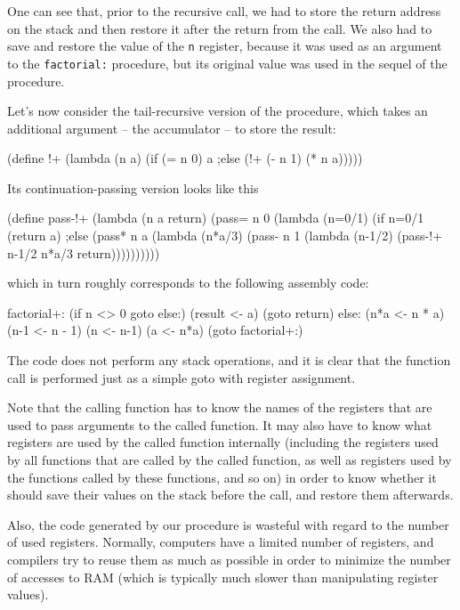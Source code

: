One can see that, prior to the recursive call, we had to store
the return address on the stack and then restore it after the return
from the call. We also had to save and restore the value of the
\texttt{n} register, because it was used as an argument to the
\texttt{factorial:} procedure, but its original value was used
in the sequel of the procedure.

Let's now consider the tail-recursive version of the procedure,
which takes an additional argument -- the accumulator -- to store
the result:

\begin{Snippet}
(define !+
  (lambda (n a)
    (if (= n 0)
        a
    ;else
        (!+ (- n 1) (* n a)))))
\end{Snippet}

Its continuation-passing version looks like this

\begin{Snippet}
(define pass-!+
   (lambda (n a return)
     (pass= n 0
       (lambda (n=0/1)
         (if n=0/1
           (return a)
         ;else  
           (pass* n a
             (lambda (n*a/3)
               (pass- n 1
                 (lambda (n-1/2)
                   (pass-!+ n-1/2 n*a/3 return))))))))))
\end{Snippet}

which in turn roughly corresponds to the following assembly code:

\begin{Snippet}
  factorial+:
    (if n <> 0 goto else:)
    (result <- a)
    (goto return)
  else:
    (n*a <- n * a)
    (n-1 <- n - 1)
    (n <- n-1)
    (a <- n*a)
    (goto factorial+:)
\end{Snippet}

The code does not perform any stack operations, and it is clear
that the function call is performed just as a simple goto with
register assignment.

Note that the calling function has to know the names of the registers
that are used to pass arguments to the called function. It may also
have to know what registers are used by the called function internally
(including the registers used by all functions that are called by
the called function, as well as registers used by the functions
called by these functions, and so on) in order to know whether
it should save their values on the stack before the call, and
restore them afterwards.

Also, the code generated by our procedure is wasteful with regard
to the number of used registers. Normally, computers have a limited
number of registers, and compilers try to reuse them as much as possible
in order to minimize the number of accesses to RAM (which is typically
much slower than manipulating register values).


